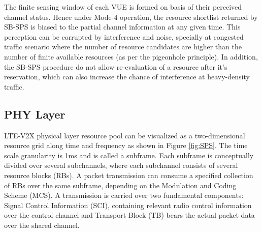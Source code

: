 \documentclass[iicol]{sn-jnl}%
\theoremstyle{thmstyleone}%
\theoremstyle{thmstyletwo}%
\theoremstyle{thmstylethree}%
\begin{document}
The finite sensing window of each VUE is formed on basis of their perceived channel status. Hence under Mode-4 operation, the resource shortlist returned by SB-SPS is biased to the partial channel information at any given time. This perception can be corrupted by interference and noise, specially at congested traffic scenario where the number of resource candidates are higher than the number of finite available resources (as per the pigeonhole principle). In addition, the SB-SPS procedure do not allow re-evaluation of a resource after it's reservation, which can also increase the chance of interference at heavy-density traffic.



\subsection{PHY Layer}
LTE-V2X physical layer resource pool can be visualized as a two-dimensional resource grid along time and frequency as shown in Figure \ref{fig:SPS}. The time scale granularity is 1ms and is called a subframe. Each subframe is conceptually divided over several subchannels, where each subchannel consists of several resource blocks (RBs). A packet transmission can consume a specified collection of RBs over the same subframe, depending on the Modulation and Coding Scheme (MCS). A transmission is carried over two fundamental components: Signal Control Information (SCI), containing relevant radio control information over the control channel and Transport Block (TB) bears the actual packet data over the shared channel.
\end{document}

